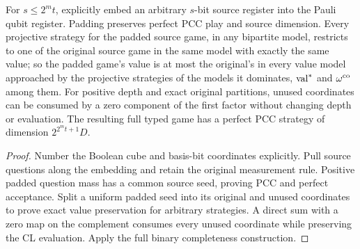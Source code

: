 \begin{lemma}
\label{lem:intro-binary-source-padding}
\leanok
For $s\leq2^m t$, explicitly embed an arbitrary $s$-bit source register
into the Pauli qubit register. Padding preserves perfect PCC play and
source dimension. Every projective strategy for the padded source game, in any bipartite
model, restricts to one of the original source game in the same model with exactly the same
value; so the padded game's value is at most the original's in every value model approached by
the projective strategies of the models it dominates, $\mathrm{val}^*$ and $\omega^{\mathrm{co}}$ among them.
For positive depth and exact original partitions, unused coordinates
can be consumed by a zero component of the first factor without changing
depth or evaluation. The resulting full typed game has a perfect PCC
strategy of dimension $2^{2^m t+1}D$.
\end{lemma}
\begin{proof}
\leanok
Number the Boolean cube and basis-bit coordinates explicitly. Pull source
questions along the embedding and retain the original measurement rule.
Positive padded question mass has a common source seed, proving PCC and
perfect acceptance. Split a uniform padded seed into its original and
unused coordinates to prove exact value preservation for arbitrary
strategies. A direct sum with a zero map on the complement consumes every
unused coordinate while preserving the CL evaluation. Apply the full
binary completeness construction.
\end{proof}


